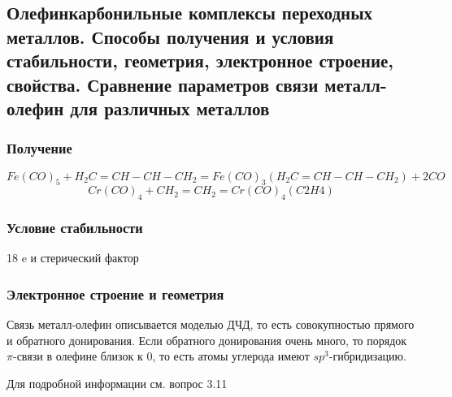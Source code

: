 
\subsection{Олефинкарбонильные комплексы переходных металлов. Способы получения и условия стабильности, геометрия, электронное строение, свойства. Сравнение параметров связи металл-олефин для различных металлов}

\subsubsection*{Получение}

$$Fe(CO)_5 + H_2C=CH-CH-CH_2 = Fe(CO)_3(H_2C=CH-CH-CH_2) + 2CO$$
$$Cr(CO)_4 + CH_2=CH_2 = Cr(CO)_4(C2H4)$$

\subsubsection*{Условие стабильности}

18 e и стерический фактор

\subsubsection*{Электронное строение и геометрия}

Связь металл-олефин описывается моделью ДЧД, то есть совокупностью прямого и обратного донирования. Если обратного донирования очень много, то порядок $\pi$-связи в олефине близок к 0, то есть атомы углерода имеют $sp^3$-гибридизацию.

Для подробной информации см. вопрос 3.11


